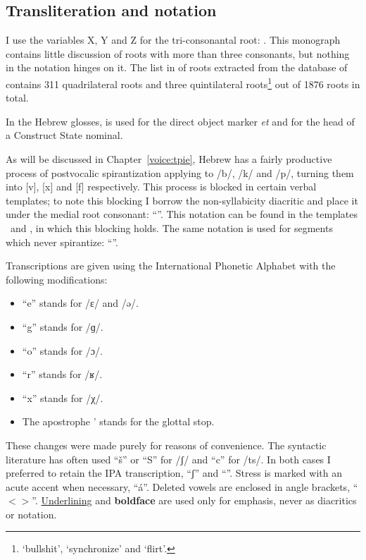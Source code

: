 	\subsection{Transliteration and notation} \label{sec:data:notation}
I use the variables X, Y and Z for the tri-consonantal root: . This monograph contains little discussion of roots with more than three consonants, but nothing in the notation hinges on it. The list in of roots extracted from the database of \cite{ehrenfeld12} contains 311 quadrilateral roots and three quintilateral roots\footnote{ `bullshit',  `synchronize' and  `flirt'.} out of 1876 roots in total.

In the Hebrew glosses,  is used for the direct object marker \emph{et} and  for the head of a Construct State nominal.

As will be discussed in Chapter~\ref{voice:tpie}, Hebrew has a fairly productive process of postvocalic spirantization applying to /b/, /k/ and /p/, turning them into [v], [x] and [f] respectively. This process is blocked in certain verbal templates; to note this blocking I borrow the non-syllabicity diacritic and place it under the medial root consonant: ``''. This notation can be found in the templates \tpie~and \thit, in which this blocking holds. The same notation is used for segments which never spirantize: ``''.

Transcriptions are given using the International Phonetic Alphabet with the following modifications:
\begin{itemize}
	\item ``e'' stands for /ɛ/ and /ə/.
	\item ``g'' stands for /ɡ/.
	\item ``o'' stands for /ɔ/.
	\item ``r'' stands for /ʁ/.
	\item ``x'' stands for /χ/.
	\item The apostrophe ' stands for the glottal stop. %
\end{itemize}
These changes were made purely for reasons of convenience. The syntactic literature has often used ``\v{s}'' or ``S'' for /ʃ/ and ``c'' for /ts/. In both cases I preferred to retain the IPA transcription, ``ʃ'' and ``{\ts}''. Stress is marked with an acute accent when necessary, ``\'a''. Deleted vowels are enclosed in angle brackets, ``$<>$''. \underline{Underlining} and \textbf{boldface} are used only for emphasis, never as diacritics or notation.

